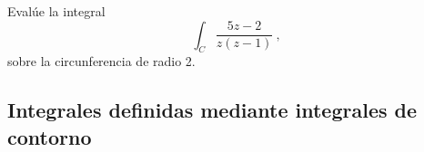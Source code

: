 \begin{ejemplo}
    Evalúe la integral 
    \begin{equation*}
        \int_C \frac{5z-2}{z(z-1)} \ , 
    \end{equation*}
    sobre la circunferencia de radio 2.
\end{ejemplo}

\subsection{Integrales definidas mediante integrales de contorno}
